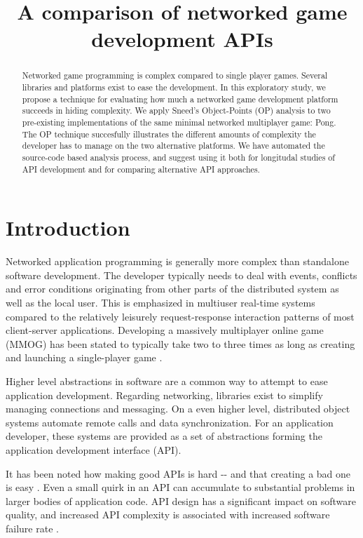 \documentclass[conference]{IEEEtran}
\title{\phantomsection%
  A comparison of networked game development APIs%
  \label{a-comparison-of-networked-game-development-apis}}
\author{}
\date{}
\begin{document}
\maketitle
\begin{abstract}
Networked game programming is complex compared to single
player games. Several libraries and platforms exist to ease the
development. In this exploratory study, we propose a technique for
evaluating how much a networked game development platform succeeds
in hiding complexity. We apply Sneed's Object-Points (OP) analysis
to two pre-existing implementations of the same minimal networked
multiplayer game: Pong. The OP technique succesfully illustrates
the different amounts of complexity the developer has to manage on
the two alternative platforms. We have automated the source-code
based analysis process, and suggest using it both for longitudal
studies of API development and for comparing alternative API
approaches.
\end{abstract}


\section{Introduction%
  \label{introduction}%
}

Networked application programming is generally more complex than
standalone software development. The developer typically needs to deal
with events, conflicts and error conditions originating from other
parts of the distributed system as well as the local user. This is
emphasized in multiuser real-time systems compared to the relatively
leisurely request-response interaction patterns of most client-server
applications. Developing a massively multiplayer online game (MMOG)
has been stated to typically take two to three times as long as
creating and launching a single-player game \cite{middleware}.

Higher level abstractions in software are a common way to attempt to
ease application development. Regarding networking, libraries exist to
simplify managing connections and messaging. On a even higher level,
distributed object systems automate remote calls and data
synchronization. For an application developer, these systems are
provided as a set of abstractions forming the application development
interface (API).

It has been noted how making good APIs is hard -{}- and that creating a
bad one is easy \cite{api-matters}. Even a small quirk in an API can
accumulate to substantial problems in larger bodies of application
code. API design has a significant impact on software quality, and
increased API complexity is associated with increased software failure
rate \cite{cmu-api_failures}.
\end{document}
